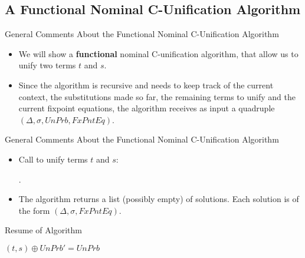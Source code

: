 \subsection{A Functional Nominal C-Unification Algorithm}

\begin{frame}{General Comments About the Functional Nominal C-Unification Algorithm}
\begin{itemize}
    \item We will show a \textbf{functional} nominal C-unification algorithm, that allow us to
    unify two terms $t$ and $s$.
    \item Since the algorithm is recursive and needs to keep track of the current context,
        the substitutions made so far, the remaining terms to unify and the current
        fixpoint equations, the algorithm receives as input a quadruple 
        $(\Delta, \sigma, UnPrb, FxPntEq)$.
\end{itemize}
\end{frame}

\begin{frame}{General Comments About the Functional Nominal C-Unification Algorithm}
\begin{itemize}
    \item Call to unify terms $t$ and $s$: 
    \begin{algorithmic}[1]
        .
    \end{algorithmic}
    \item The algorithm returns a list (possibly empty) of solutions. Each solution
        is of the form $(\Delta, \sigma, FxPntEq)$.
\end{itemize}
\end{frame}

\begin{frame}[allowframebreaks]{Resume of Algorithm}
\begin{algorithmic}[1]
        \State {} 
    \Else 
        \State $(t, s) \oplus UnPrb' = UnPrb$
    \EndIf
\EndProcedure
\end{algorithmic}
\end{frame}

